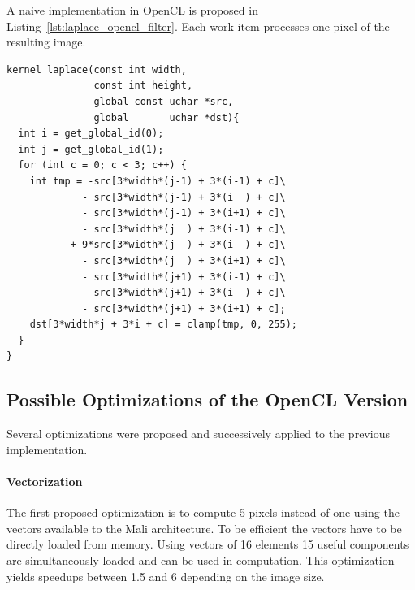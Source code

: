 \documentclass[11pt, a4paper, twoside]{montblanc}
\begin{document}
A naive implementation in OpenCL is proposed in
Listing~\ref{lst:laplace_opencl_filter}. Each work item processes one pixel of
the resulting image.

\begin{lstlisting}
kernel laplace(const int width,
               const int height,
               global const uchar *src,
               global       uchar *dst){
  int i = get_global_id(0);
  int j = get_global_id(1);
  for (int c = 0; c < 3; c++) {
    int tmp = -src[3*width*(j-1) + 3*(i-1) + c]\
             - src[3*width*(j-1) + 3*(i  ) + c]\
             - src[3*width*(j-1) + 3*(i+1) + c]\
             - src[3*width*(j  ) + 3*(i-1) + c]\
           + 9*src[3*width*(j  ) + 3*(i  ) + c]\
             - src[3*width*(j  ) + 3*(i+1) + c]\
             - src[3*width*(j+1) + 3*(i-1) + c]\
             - src[3*width*(j+1) + 3*(i  ) + c]\
             - src[3*width*(j+1) + 3*(i+1) + c];
    dst[3*width*j + 3*i + c] = clamp(tmp, 0, 255);
  }
}
\end{lstlisting}



\subsection{Possible Optimizations of the OpenCL Version}

Several optimizations were proposed and successively applied to the previous
implementation.

\paragraph{Vectorization}
The first proposed optimization is to compute 5 pixels instead of one using the
vectors available to the Mali architecture. To be efficient the vectors have to
be directly loaded from memory. Using vectors of 16 elements 15 useful components
are simultaneously loaded and can be used in computation. This optimization
yields speedups between 1.5 and 6 depending on the image size.
\end{document}
